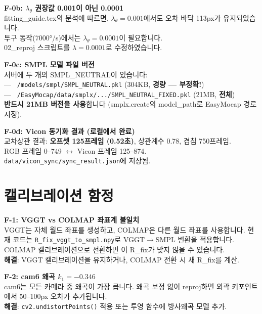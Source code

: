 \documentclass[11pt, a4paper]{report}
\begin{document}
\begin{failbox}
\textbf{F-0b: $\lambda_\theta$ 권장값 0.001이 아닌 0.0001}\\
fitting\_guide.tex의 분석에 따르면, $\lambda_\theta = 0.001$에서도 오차 바닥 113px가 유지되었습니다.\\
투구 동작(7000°/s)에서는 \textbf{$\lambda_\theta = 0.0001$}이 필요합니다.\\
02\_reproj 스크립트를 $\lambda = 0.0001$로 수정하였습니다.
\end{failbox}

\begin{failbox}
\textbf{F-0c: SMPL 모델 파일 버전}\\
서버에 두 개의 SMPL\_NEUTRAL이 있습니다:\\
--- \texttt{~/models/smpl/SMPL\_NEUTRAL.pkl} (304KB, \textbf{경량 --- 부정확!})\\
--- \texttt{~/EasyMocap/data/smplx/.../SMPL\_NEUTRAL\_FIXED.pkl} (21MB, \textbf{전체})\\
\textbf{반드시 21MB 버전을 사용}합니다 (smplx.create의 model\_path로 EasyMocap 경로 지정).
\end{failbox}

\begin{failbox}
\textbf{F-0d: Vicon 동기화 결과 (로컬에서 완료)}\\
교차상관 결과: \textbf{오프셋 125프레임 (0.52초)}, 상관계수 0.78, 겹침 750프레임.\\
RGB 프레임 0--749 $\leftrightarrow$ Vicon 프레임 125--874.\\
\texttt{data/vicon\_sync/sync\_result.json}에 저장됨.
\end{failbox}

\section{캘리브레이션 함정}

\begin{failbox}
\textbf{F-1: VGGT vs COLMAP 좌표계 불일치}\\
VGGT는 자체 월드 좌표를 생성하고, COLMAP은 다른 월드 좌표를 사용합니다.
현재 코드는 \texttt{R\_fix\_vggt\_to\_smpl.npy}로 VGGT$\to$SMPL 변환을 적용합니다.
COLMAP 캘리브레이션으로 전환하면 이 R\_fix가 맞지 않을 수 있습니다.\\
\textbf{해결}: VGGT 캘리브레이션을 유지하거나, COLMAP 전환 시 새 R\_fix를 계산.
\end{failbox}

\begin{failbox}
\textbf{F-2: cam6 왜곡 $k_1 = -0.346$}\\
cam6는 모든 카메라 중 왜곡이 가장 큽니다. 왜곡 보정 없이 reproj하면 외곽 키포인트에서 50--100px 오차가 추가됩니다.\\
\textbf{해결}: \texttt{cv2.undistortPoints()} 적용 또는 투영 함수에 방사왜곡 모델 추가.
\end{failbox}
\end{document}
